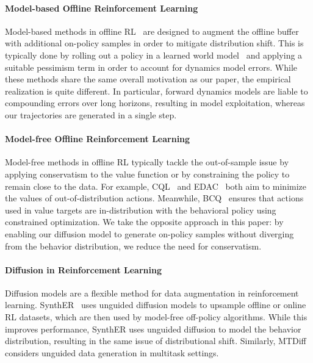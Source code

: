 \documentclass[10pt]{article} %
\theoremstyle{plain}
\theoremstyle{definition}
\theoremstyle{remark}
\begin{document}
\paragraph{Model-based Offline Reinforcement Learning}
Model-based methods in offline RL~\citep{mopo, kidambi2020morel, rambo, lu2022revisiting} are designed to augment the offline buffer with additional on-policy samples in order to mitigate distribution shift.
This is typically done by rolling out a policy in a learned world model~\citep{janner2019mbpo} and applying a suitable pessimism term in order to account for dynamics model errors.
While these methods share the same overall motivation as our paper, the empirical realization is quite different.
In particular, forward dynamics models are liable to compounding errors over long horizons, resulting in model exploitation, whereas our trajectories are generated in a single step.

\paragraph{Model-free Offline Reinforcement Learning}
Model-free methods in offline RL typically tackle the out-of-sample issue by applying conservatism to the value function or by constraining the policy to remain close to the data.
For example, CQL~\citep{kumar2020conservative} and EDAC~\citep{an2021uncertainty} both aim to minimize the values of out-of-distribution actions.
Meanwhile, BCQ~\citep{bcq} ensures that actions used in value targets are in-distribution with the behavioral policy using constrained optimization.
We take the opposite approach in this paper: by enabling our diffusion model to generate on-policy samples without diverging from the behavior distribution, we reduce the need for conservatism.

\paragraph{Diffusion in Reinforcement Learning}
Diffusion models are a flexible method for data augmentation in reinforcement learning.
SynthER~\citep{lu2023synthetic} uses unguided diffusion models to upsample offline or online RL datasets, which are then used by model-free off-policy algorithms.
While this improves performance, SynthER uses unguided diffusion to model the behavior distribution, resulting in the same issue of distributional shift.
Similarly, MTDiff~\citep{he2023diffusion} considers unguided data generation in multitask settings.
\end{document}
